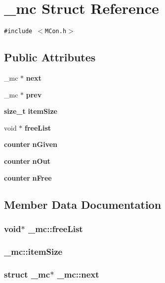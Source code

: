 \section{\_\-mc  Struct Reference}
\label{struct__mc}
{\tt \#include $<$MCon.h$>$}

\subsection*{Public Attributes}
\begin{CompactItemize}
\item 
\_\-mc $\ast$ {\bf next}
\item 
\_\-mc $\ast$ {\bf prev}
\item 
{\bf size\_\-t} {\bf item\-Size}
\item 
void $\ast$ {\bf free\-List}
\item 
{\bf counter} {\bf n\-Given}
\item 
{\bf counter} {\bf n\-Out}
\item 
{\bf counter} {\bf n\-Free}
\end{CompactItemize}


\subsection{Member Data Documentation}
\subsubsection{\setlength{\rightskip}{0pt plus 5cm}void$\ast$ \_\-mc::free\-List}\label{struct__mc_m3}


\subsubsection{ \_\-mc::item\-Size}\label{struct__mc_m2}


\subsubsection{\setlength{\rightskip}{0pt plus 5cm}struct \_\-mc$\ast$ \_\-mc::next}\label{struct__mc_m0}


